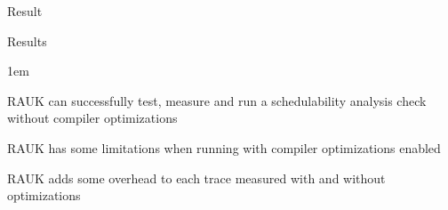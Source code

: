 \begin{frame}{Result}
    \begin{block}{Results}
        \begin{itemize-size}{1em}
            \item RAUK can successfully test, measure and
            run a schedulability analysis check without compiler optimizations
            \item RAUK has some limitations when running with compiler optimizations
            enabled
            \item RAUK adds some overhead to each trace measured with and without
            optimizations
        \end{itemize-size}
    \end{block}
\end{frame}
